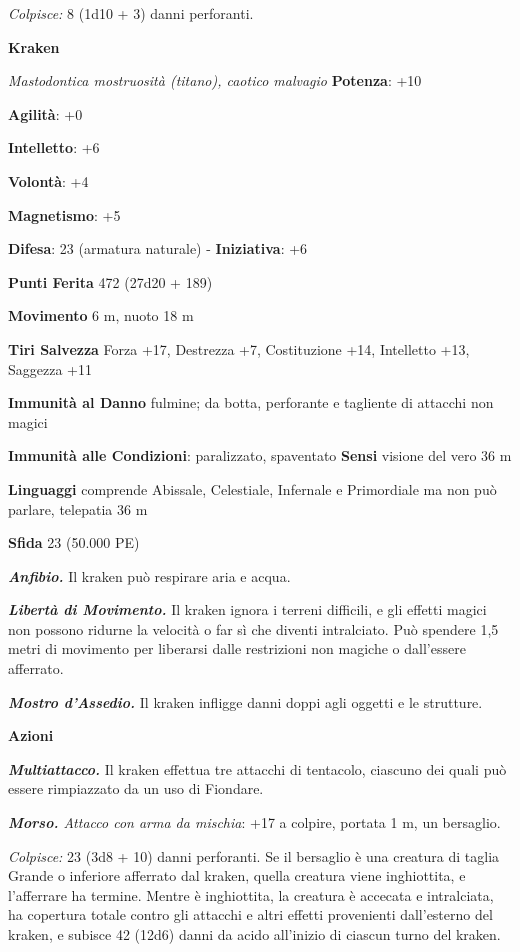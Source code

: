\begin{multicols}{2}
\emph{Colpisce:} 8 (1d10 + 3) danni perforanti.

\textbf{Kraken}

\emph{Mastodontica mostruosità (titano), caotico malvagio}
\textbf{Potenza}: +10

\textbf{Agilità}: +0

\textbf{Intelletto}: +6

\textbf{Volontà}: +4

\textbf{Magnetismo}: +5

\textbf{Difesa}: 23 (armatura naturale) - \textbf{Iniziativa}: +6

\textbf{Punti Ferita} 472 (27d20 + 189) 

\textbf{Movimento} 6 m, nuoto 18 m

\textbf{Tiri Salvezza} Forza +17, Destrezza +7, Costituzione +14,
Intelletto +13, Saggezza +11

\textbf{Immunità al Danno} fulmine; da botta, perforante e tagliente
di attacchi non magici

\textbf{Immunità alle Condizioni}: paralizzato, spaventato \textbf{Sensi}
visione del vero 36 m

\textbf{Linguaggi} comprende Abissale, Celestiale, Infernale e Primordiale ma non può
parlare, telepatia 36 m 

\textbf{Sfida} 23 (50.000 PE)\smallskip

\emph{\textbf{Anfibio.}} Il kraken può respirare aria e acqua.

\emph{\textbf{Libertà di Movimento.}} Il kraken ignora i terreni
difficili, e gli effetti magici non possono ridurne la velocità o far sì
che diventi intralciato. Può spendere 1,5 metri di movimento per
liberarsi dalle restrizioni non magiche o dall'essere afferrato.

\emph{\textbf{Mostro d'Assedio.}} Il kraken infligge danni doppi agli
oggetti e le strutture.

\smallskip\textbf{Azioni}

\emph{\textbf{Multiattacco.}} Il kraken effettua tre attacchi di
tentacolo, ciascuno dei quali può essere rimpiazzato da un uso di
Fiondare.

\emph{\textbf{Morso.} Attacco con arma da mischia}: +17 a colpire,
portata 1 m, un bersaglio.

\emph{Colpisce:} 23 (3d8 + 10) danni perforanti. Se il bersaglio è una
creatura di taglia Grande o inferiore afferrato dal kraken, quella
creatura viene inghiottita, e l'afferrare ha termine. Mentre è
inghiottita, la creatura è accecata e intralciata, ha copertura totale
contro gli attacchi e altri effetti provenienti dall'esterno del kraken,
e subisce 42 (12d6) danni da acido all'inizio di ciascun turno del
kraken.


\end{multicols}
